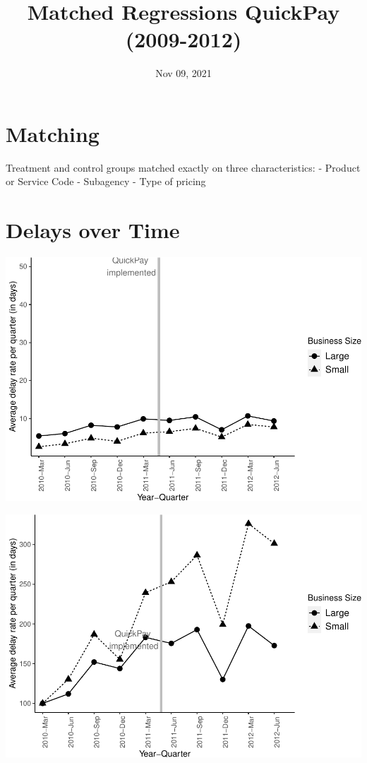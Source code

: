 \documentclass[
]{article}
\title{Matched Regressions QuickPay (2009-2012)}
\author{}
\date{\vspace{-2.5em}Nov 09, 2021}
\begin{document}
\maketitle

\hypertarget{matching}{%
\section{Matching}\label{matching}}

Treatment and control groups matched exactly on three characteristics: -
Product or Service Code - Subagency - Type of pricing

\hypertarget{delays-over-time}{%
\section{Delays over Time}\label{delays-over-time}}

\includegraphics{qp_first_matched_files/figure-latex/plot-1.pdf}

\includegraphics{qp_first_matched_files/figure-latex/normalized_plot-1.pdf}
\end{document}

